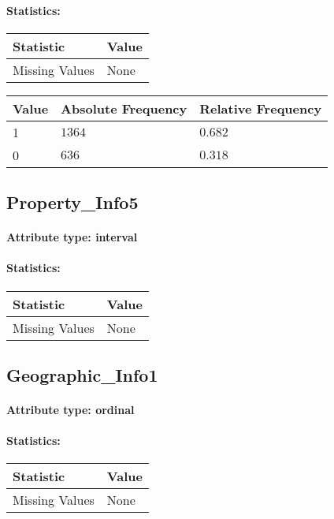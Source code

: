 \paragraph{Statistics: }
\begin{table}[H]
	\renewcommand{\arraystretch}{1.25}
	\begin{tabular}{l|l}
		\textbf{Statistic} & \textbf{Value}\\\hline
		Missing Values& None\\\hline
	\end{tabular}
\end{table}
\begin{table}[H]
	\renewcommand{\arraystretch}{1.25}
	\begin{tabular}{l|l|l}
		\textbf{Value} & \textbf{Absolute Frequency} & \textbf{Relative Frequency}\\\hline
		1&$1364$&$0.682$\\\hline
		0&$636$&$0.318$
	\end{tabular}
\end{table}

\subsection{Property\_Info5}
\paragraph{Attribute type: interval}
\paragraph{Statistics: }
\begin{table}[H]
	\renewcommand{\arraystretch}{1.25}
	\begin{tabular}{l|l}
		\textbf{Statistic} & \textbf{Value}\\\hline
		Missing Values& None\\\hline
	\end{tabular}
\end{table}

\subsection{Geographic\_Info1}
\paragraph{Attribute type: ordinal}
\paragraph{Statistics: }
\begin{table}[H]
	\renewcommand{\arraystretch}{1.25}
	\begin{tabular}{l|l}
		\textbf{Statistic} & \textbf{Value}\\\hline
		Missing Values& None\\\hline
	\end{tabular}
\end{table}

